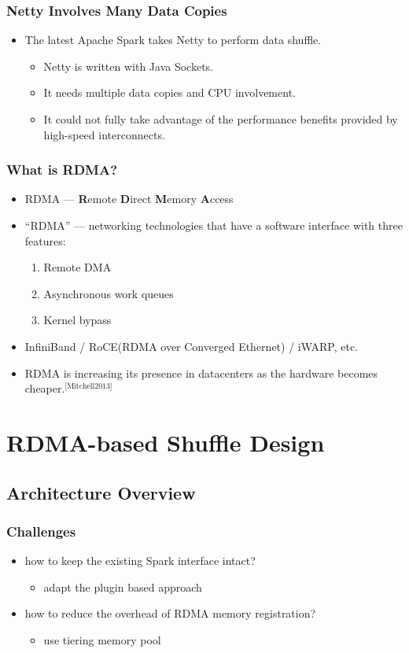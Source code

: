 \documentclass{beamer}
\begin{document}
\begin{frame}
  \frametitle{Netty Involves Many Data Copies}
  \begin{itemize}
  \item The latest Apache Spark takes Netty to perform data shuffle.
    \begin{itemize}
    \item Netty is written with Java Sockets.
    \item It needs multiple data copies and CPU involvement.
    \item It could not fully take advantage of the performance benefits provided
      by high-speed interconnects.
    \end{itemize}
  \end{itemize}
\end{frame}

\begin{frame}
  \frametitle{What is RDMA?}
  \begin{itemize}
  \item RDMA --- \textbf{R}emote \textbf{D}irect \textbf{M}emory \textbf{A}ccess
  \item ``RDMA'' --- networking technologies that have a software interface with
    three features:
    \begin{enumerate}
    \item Remote DMA
    \item Asynchronous work queues
    \item Kernel bypass
    \end{enumerate}
  \item InfiniBand / RoCE(RDMA over Converged Ethernet) / iWARP, etc.
  \item RDMA is increasing its presence in datacenters as the hardware becomes
    cheaper.$^{\text{[Mitchell2013]}}$
  \end{itemize}
\end{frame}

\section{RDMA-based Shuffle Design}

\subsection{Architecture Overview}

\begin{frame}
  \frametitle{Challenges}
  \begin{itemize}
  \item how to keep the existing Spark interface intact?
    \begin{itemize}
    \item adapt the plugin based approach
    \end{itemize}
  \item how to reduce the overhead of RDMA memory registration?
    \begin{itemize}
    \item use tiering memory pool
    \end{itemize}
  \end{itemize}
\end{frame}
\end{document}
